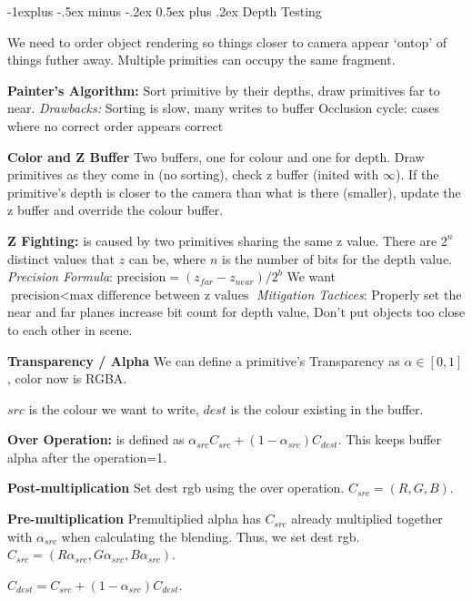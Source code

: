 \documentclass[letterpaper, 8pt]{extarticle}
\makeatletter
\renewcommand{\section}{\@startsection{section}{1}{0mm}%
                                {-1explus -.5ex minus -.2ex}%
                                {0.5ex plus .2ex}%
                                {\normalfont\normalsize\bfseries}}
\makeatother
\begin{document}
\begin{multicols*}{4}
\section{Depth Testing}

We need to order object rendering so things closer to camera appear `ontop' of things futher away.
Multiple primities can occupy the same fragment.

\textbf{Painter's Algorithm:} Sort primitive by their depths, draw primitives far to near. \textit{Drawbacks:} Sorting is slow, many writes to buffer
Occlusion cycle: cases where no correct order appears correct



\textbf{Color and Z Buffer} Two buffers, one for colour and one for depth. 
Draw primitives as they come in (no sorting), 
check z buffer (inited with $\infty$). 
If the primitive's depth is closer to the camera than what is there (smaller), update the z buffer and override the colour buffer.

\textbf{Z Fighting:} is caused by two primitives sharing the same z value. There are $2^n$ distinct values that $z$ can be, where $n$ is the number of bits for the depth value.
\textit{Precision Formula}:
\(
\text{precision} = (z_{far} - z_{near}) / 2^b
\)
We want \(\text{precision} < \text{max difference between z values}\)
\textit{Mitigation Tactices}: Properly set the near and far planes increase bit count for depth value, Don't put objects too close to each other in scene.


\textbf{Transparency / Alpha}
We can define a primitive's Transparency as $\alpha \in [0, 1]$, color now is RGBA.

$src$ is the colour we want to write, $dest$ is the colour existing in the buffer.

\textbf{Over Operation:} is defined as $\alpha_{src}C_{src} + (1-\alpha_{src})C_{dest}$.
This keeps buffer alpha after the operation=1.

\textbf{Post-multiplication}
Set dest rgb using the over operation. $C_{src} = (R,G,B)$.

\textbf{Pre-multiplication}
Premultiplied alpha has $C_{src}$ already multiplied together with $\alpha_{src}$ when calculating the blending.
Thus, we set dest rgb. $C_{src} = (R\alpha_{src},G\alpha_{src},B\alpha_{src})$.

$C_{dest} = C_{src} + (1-\alpha_{src})C_{dest}$.


\end{multicols*}
\end{document}

